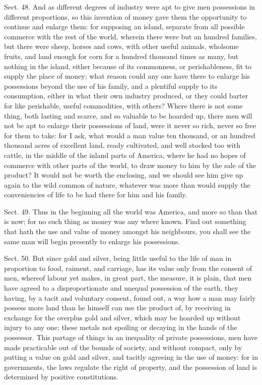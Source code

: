 \documentclass[11pt,openany]{book}
\begin{document}
Sect. 48. And as different degrees of industry were apt to give men possessions in different proportions, so this invention of money gave them the opportunity to continue and enlarge them: for supposing an island, separate from all possible commerce with the rest of the world, wherein there were but an hundred families, but there were sheep, horses and cows, with other useful animals, wholsome fruits, and land enough for corn for a hundred thousand times as many, but nothing in the island, either because of its commonness, or perishableness, fit to supply the place of money; what reason could any one have there to enlarge his possessions beyond the use of his family, and a plentiful supply to its consumption, either in what their own industry produced, or they could barter for like perishable, useful commodities, with others? Where there is not some thing, both lasting and scarce, and so valuable to be hoarded up, there men will not be apt to enlarge their possessions of land, were it never so rich, never so free for them to take: for I ask, what would a man value ten thousand, or an hundred thousand acres of excellent land, ready cultivated, and well stocked too with cattle, in the middle of the inland parts of America, where he had no hopes of commerce with other parts of the world, to draw money to him by the sale of the product? It would not be worth the enclosing, and we should see him give up again to the wild common of nature, whatever was more than would supply the conveniencies of life to be had there for him and his family.

Sect. 49. Thus in the beginning all the world was America, and more so than that is now; for no such thing as money was any where known. Find out something that hath the use and value of money amongst his neighbours, you shall see the same man will begin presently to enlarge his possessions.

Sect. 50. But since gold and silver, being little useful to the life of man in proportion to food, raiment, and carriage, has its value only from the consent of men, whereof labour yet makes, in great part, the measure, it is plain, that men have agreed to a disproportionate and unequal possession of the earth, they having, by a tacit and voluntary consent, found out, a way how a man may fairly possess more land than he himself can use the product of, by receiving in exchange for the overplus gold and silver, which may be hoarded up without injury to any one; these metals not spoiling or decaying in the hands of the possessor. This partage of things in an inequality of private possessions, men have made practicable out of the bounds of society, and without compact, only by putting a value on gold and silver, and tacitly agreeing in the use of money: for in governments, the laws regulate the right of property, and the possession of land is determined by positive constitutions.
\end{document}
